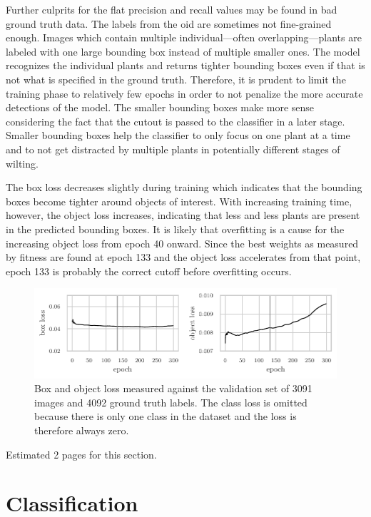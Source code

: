 \documentclass[draft,final]{vutinfth} %
\begin{document}
Further culprits for the flat precision and recall values may be found
in bad ground truth data. The labels from the \gls{oid} are sometimes not
fine-grained enough. Images which contain multiple individual—often
overlapping—plants are labeled with one large bounding box instead of
multiple smaller ones. The model recognizes the individual plants and
returns tighter bounding boxes even if that is not what is specified
in the ground truth. Therefore, it is prudent to limit the training
phase to relatively few epochs in order to not penalize the more
accurate detections of the model. The smaller bounding boxes make more
sense considering the fact that the cutout is passed to the classifier
in a later stage. Smaller bounding boxes help the classifier to only
focus on one plant at a time and to not get distracted by multiple
plants in potentially different stages of wilting.

The box loss decreases slightly during training which indicates that
the bounding boxes become tighter around objects of interest. With
increasing training time, however, the object loss increases,
indicating that less and less plants are present in the predicted
bounding boxes. It is likely that overfitting is a cause for the
increasing object loss from epoch 40 onward. Since the best weights as
measured by fitness are found at epoch 133 and the object loss
accelerates from that point, epoch 133 is probably the correct cutoff
before overfitting occurs.

\begin{figure}
  \centering
  \includegraphics{graphics/val_box_obj_loss.pdf}
  \caption[Object detection box and object loss.]{Box and object loss
    measured against the validation set of 3091 images and 4092 ground
    truth labels. The class loss is omitted because there is only one
    class in the dataset and the loss is therefore always zero.}
  \label{fig:box-obj-loss}
\end{figure}

Estimated 2 pages for this section.

\section{Classification}
\label{sec:development-classification}
\end{document}
